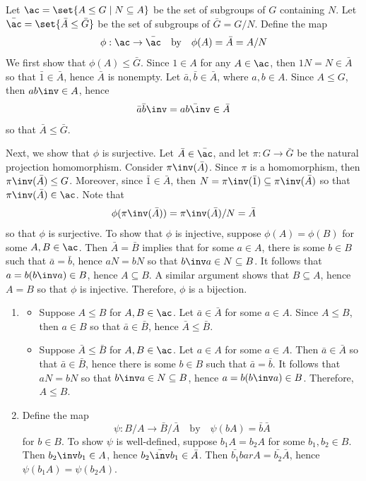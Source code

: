 \begin{sol}
    Let $\ac = \set{A \leq G \mid N \subseteq A}$ be the set of subgroups of $G$ containing $N$. Let $\bar{\ac} = \set{\bar A \leq \bar G}$ be the set of subgroups of $\bar G = G/N$. Define the map
    \[\phi : \ac \to \bar{\ac} \quad \text{by} \quad \phi(A) = \bar A = A/N\]
    We first show that $\phi(A) \leq \bar G$. Since $1 \in A$ for any $A \in \ac$, then $1N = N \in \bar A$ so that $\bar 1 \in \bar A$, hence $\bar A$ is nonempty. Let $\bar a, \bar b \in \bar A$, where $a, b \in A$. Since $A \leq G$, then $ab\inv \in A$, hence
    \[\bar a \bar b\inv = \bar{ab\inv} \in \bar A\]
    so that $\bar A \leq \bar G$.

    Next, we show that $\phi$ is surjective. Let $\bar A \in \bar{\ac}$, and let $\pi : G \to \bar G$ be the natural projection homomorphism. Consider $\pi\inv(\bar A)$. Since $\pi$ is a homomorphism, then $\pi\inv(\bar A) \leq G$. Moreover, since $\bar 1 \in \bar A$, then $N = \pi\inv(\bar 1) \subseteq \pi\inv(\bar A)$ so that $\pi\inv(\bar A) \in \ac$. Note that
    \[\phi(\pi\inv(\bar A)) = \pi\inv(\bar A)/N = \bar A\]
    so that $\phi$ is surjective. To show that $\phi$ is injective, suppose $\phi(A) = \phi(B)$ for some $A, B \in \ac$. Then $\bar A = \bar B$ implies that for some $a \in A$, there is some $b \in B$ such that $\bar a = \bar b$, hence $aN = bN$ so that $b\inv a \in N \subseteq B$. It follows that $a = b(b\inv a) \in B$, hence $A \subseteq B$. A similar argument shows that $B \subseteq A$, hence $A = B$ so that $\phi$ is injective. Therefore, $\phi$ is a bijection.
    \begin{enumerate}
        \item 
        \begin{itemize}
            \item[\rightimp] Suppose $A \leq B$ for $A, B \in \ac$. Let $\bar a \in \bar A$ for some $a \in A$. Since $A \leq B$, then $a \in B$ so that $\bar a \in \bar B$, hence $\bar A \leq \bar B$.
            \item[\leftimp] Suppose $\bar A \leq \bar B$ for $A, B \in \ac$. Let $a \in A$ for some $a \in A$. Then $\bar a \in \bar A$ so that $\bar a \in \bar B$, hence there is some $b \in B$ such that $\bar a = \bar b$. It follows that $aN = bN$ so that $b\inv a \in N \subseteq B$, hence $a = b(b\inv a) \in B$. Therefore, $A \leq B$.
        \end{itemize}
        \item Define the map
        \[\psi : B/A \to \bar B / \bar A \quad \text{by} \quad \psi(bA) = \bar b \bar A\]
        for $b \in B$. To show $\psi$ is well-defined, suppose $b_1A = b_2A$ for some $b_1, b_2 \in B$. Then $b_2\inv b_1 \in A$, hence $\bar{b_2\inv b_1} \in \bar A$. Then $\bar{b_1} bar A = \bar{b_2} \bar A$, hence $\psi(b_1A) = \psi(b_2A)$.


\end{enumerate}
\end{sol}
